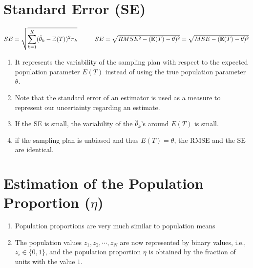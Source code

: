 \section{Standard Error (SE)}

\[
    \hfill
    SE = \sqrt{
        \dsum_{k=1}^{K}
        (\hat{\theta}_k - \mathbb{E}(T))^2\pi_k
    }
    \hspace{1cm}
    SE = \sqrt{RMSE^2 - (\mathbb{E}(T) - \theta)^2}
    = \sqrt{MSE - (\mathbb{E}(T) - \theta)^2}
    \hfill
\]

\begin{enumerate}
    \item It represents the variability of the sampling plan with respect to the expected population parameter $E(T)$ instead of using the true population parameter $\theta$.

    \item Note that the standard error of an estimator is used as a measure to represent our uncertainty regarding an estimate.

    \item If the SE is small, the variability of the $\hat{\theta}_k$’s around $E(T)$ is small.

    \item if the sampling plan is unbiased and thus $E(T) = \theta$, the RMSE and the SE are identical.

\end{enumerate}

\section{Estimation of the Population Proportion ($\eta$) \cite{ism-1}}\label{Estimation of the Population Proportion}

\begin{enumerate}
    \item Population proportions are very much similar to population means

    \item The population values $z_1, z_2,\cdots,z_N$ are now represented by binary values, i.e., $z_i \in \{0, 1\}$, and the population proportion $\eta$ is obtained by the fraction of units with the value $1$.
\end{enumerate}


